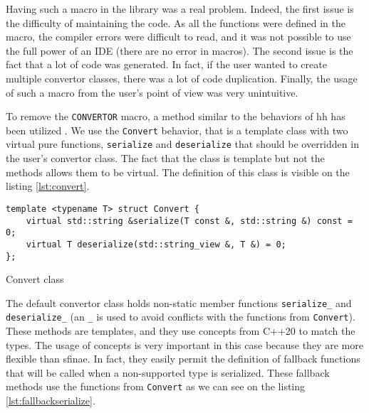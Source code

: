 Having such a macro in the library was a real problem. Indeed, the first issue
is the difficulty of maintaining the code. As all the functions were defined in
the macro, the compiler errors were difficult to read, and it was not possible
to use the full power of an IDE (there are no error in macros). The second issue
is the fact that a lot of code was generated. In fact, if the user wanted to
create multiple convertor classes, there was a lot of code duplication. Finally,
the usage of such a macro from the user's point of view was very unintuitive.

To remove the \texttt{CONVERTOR} macro, a method similar to the behaviors of
\gls{hh} has been utilized \cite{bardakoff2021analysis}. We use the
\texttt{Convert} behavior, that is a template class with two virtual pure
functions, \texttt{serialize} and \texttt{deserialize} that should be overridden
in the user's convertor class. The fact that the class is template but not the
methods allows them to be virtual. The definition of this class is visible on
the listing \ref{lst:convert}.

\begin{listing}[ht!]
\begin{verbatim}
template <typename T> struct Convert {
    virtual std::string &serialize(T const &, std::string &) const = 0;
    virtual T deserialize(std::string_view &, T &) = 0;
};
\end{verbatim}
\caption{Convert class}
\label{lst:convert}
\end{listing}

The default convertor class holds non-static member functions
\texttt{serialize\_} and \texttt{deserialize\_} (an \texttt{\_} is used to avoid
conflicts with the functions from \texttt{Convert}). These methods are
templates, and they use concepts from C++20 to match the types. The usage of
concepts is very important in this case because they are more flexible than
\gls{sfinae}. In fact, they easily permit the definition of fallback functions
that will be called when a non-supported type is serialized. These fallback
methods use the functions from \texttt{Convert} as we can see on the listing
\ref{lst:fallbackserialize}.

